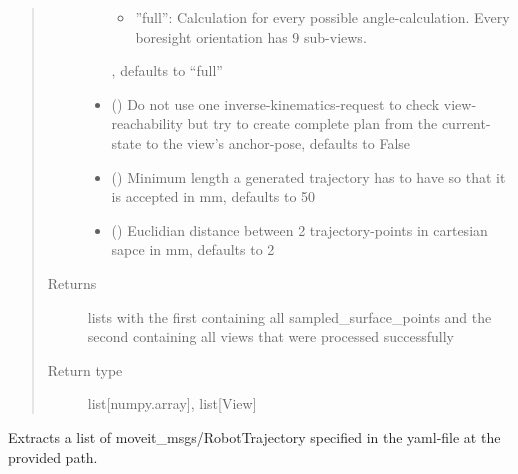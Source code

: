 \documentclass[letterpaper,10pt,english]{sphinxmanual}
\begin{document}
\begin{fulllineitems}
\begin{fulllineitems}
\begin{quote}
\begin{description}
\begin{itemize}
\begin{itemize}
\item {} 
”full”: Calculation for every possible angle-calculation. Every boresight orientation has 9 sub-views.

\end{itemize}

, defaults to “full”


\item {} 
 (\sphinxstyleliteralemphasis{, }) \textendash{} Do not use one inverse-kinematics-request to check view-reachability but try to create complete plan from the current-state to the view’s anchor-pose, defaults to False

\item {} 
 (\sphinxstyleliteralemphasis{, }) \textendash{} Minimum length a generated trajectory has to have so that it is accepted in mm, defaults to 50

\item {} 
 (\sphinxstyleliteralemphasis{, }) \textendash{} Euclidian distance between 2 trajectory-points in cartesian sapce in mm, defaults to 2

\end{itemize}

\item[{Returns}]  lists with the first containing all sampled\_surface\_points and the second containing all views that were processed successfully

\item[{Return type}] \leavevmode
list{[}numpy.array{]}, list{[}View{]}

\end{description}\end{quote}

\end{fulllineitems}


\begin{fulllineitems}
\label{\detokenize{module_trajectory_manager:agiprobot_measurement.trajectory_manager.TrajectoryManager.load_execution_plan}}
Extracts a list of moveit\_msgs/RobotTrajectory specified in the yaml-file at the provided path.


\end{fulllineitems}
\end{fulllineitems}
\end{document}
